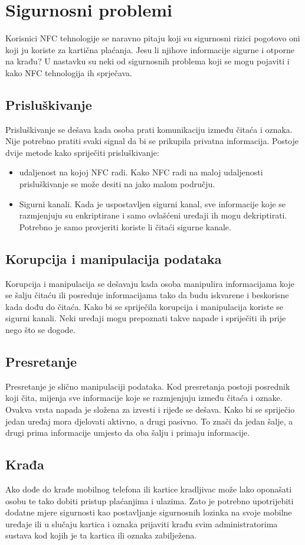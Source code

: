 \documentclass[times, utf8, zavrsni]{fer}
\begin{document}
\section{Sigurnosni problemi}
Korisnici NFC tehnologije se naravno pitaju koji su sigurnosni rizici pogotovo oni koji ju koriste za kartična plaćanja. Jesu li njihove informacije sigurne i otporne na krađu? U nastavku su neki od sigurnosnih problema koji se mogu pojaviti i kako NFC tehnologija ih sprječava.
\subsection{Prisluškivanje}
Prisluškivanje se dešava kada osoba prati komunikaciju između čitaća i oznaka. Nije potrebno pratiti svaki signal da bi se prikupila privatna informacija. Postoje dvije metode kako spriječiti prisluškivanje:
\begin{itemize}
\item udaljenost na kojoj NFC radi. Kako NFC radi na maloj udaljenosti prisluškivanje se može desiti na jako malom području.
\item Sigurni kanali. Kada je uspostavljen sigurni kanal, sve informacije koje se razmjenjuju su enkriptirane i samo ovlašćeni uređaji ih mogu dekriptirati. Potrebno je samo provjeriti koriste li čitaći sigurne kanale.
\end{itemize}
\subsection{Korupcija i manipulacija podataka}
Korupcija i manipulacija se dešavaju kada osoba manipulira informacijama koje se šalju čitaću ili posreduje informacijama tako da budu iskvarene i beskorisne kada dođu do čitaća. Kako bi se spriječila korupcija i manipulacija koriste se sigurni kanali. Neki uređaji mogu prepoznati takve napade i spriječiti ih prije nego što se dogode.
\subsection{Presretanje}
Presretanje je slično manipulaciji podataka. Kod presretanja postoji posrednik koji čita, mijenja sve informacije koje se razmjenjuju između čitaća i oznake. Ovakva vrsta napada je složena za izvesti i rijeđe se dešava. Kako bi se spriječio jedan uređaj mora djelovati aktivno, a drugi pasivno. To znači da jedan šalje, a drugi prima informacije umjesto da oba šalju i primaju informacije.
\subsection{Krađa}
Ako dođe do krađe mobilnog telefona ili kartice kradljivac može lako oponašati osobu te tako dobiti pristup plaćanjima i ulazima. Zato je potrebno upotrijebiti dodatne mjere sigurnosti kao postavljanje sigurnosnih lozinka na svoje mobilne uređaje ili u slučaju kartica i oznaka prijaviti krađu svim administratorima sustava kod kojih je ta kartica ili oznaka zabilježena.
\end{document}
